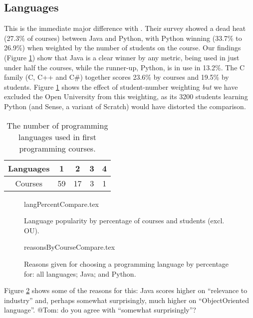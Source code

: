 \documentclass{sig-alternate}
\begin{document}
\subsection{Languages}
This is the immediate major difference with \cite{mason+cooper:2014}. Their survey showed a dead heat (27.3\% of courses) between Java and Python, with Python winning (33.7\% to 26.9\%) when weighted by the number of students on the course.  Our findings  (Figure \ref{fig:lang}) show that Java is a clear winner by any metric, being used in just under half the courses, while the runner-up, Python, is in use in  13.2\%. The C family (C, C++ and C\#) together scores 23.6\% by courses and 19.5\% by students. Figure \ref{fig:lang} shows the effect of student-number weighting \emph{but} we have excluded the Open University from this weighting, as its 3200 students learning Python (and Sense, a variant of Scratch) would have distorted the comparison.
\begin{table}[]
\centering
\caption{The number of programming languages used in first programming courses.}
\label{tab:numLanguages}
\begin{tabular}{ccccc}
\hline
Languages & 1  & 2  & 3 & 4 \\ \hline
Courses   & 59 & 17 & 3 & 1 \\ \hline
\end{tabular}
\end{table}

\begin{figure}
\begin{center}
{langPercentCompare.tex}
\end{center}\vskip-12pt
\caption{Language popularity by percentage of courses and students (excl. OU).\label{fig:lang}}
\end{figure}

\begin{figure}
\begin{center}
{reasonsByCourseCompare.tex}
\end{center}
\caption{Reasons given for choosing a programming language by percentage for: all languages; Java; and Python.\label{fig:reasons}}
\end{figure}
\par
Figure \ref{fig:reasons} shows some of the reasons for this: Java scores higher on ``relevance to industry'' and, perhaps somewhat surprisingly, much higher on ``ObjectOriented language''.  @Tom: do you agree with ``somewhat surprisingly''?
\end{document}
